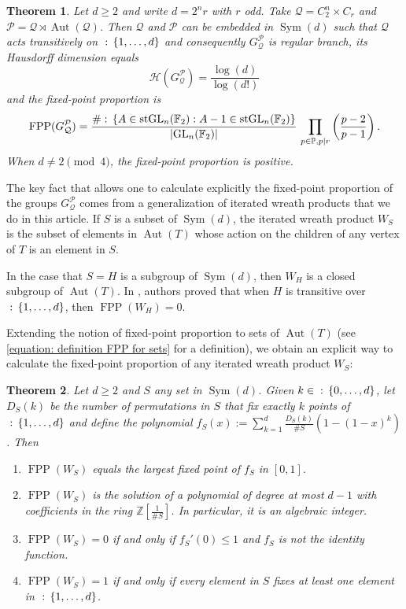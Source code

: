\documentclass{amsart}
\def\set#1{{\def\st{\;:\;}\left\{#1\right\}}}
\def\abs#1{\left\vert{#1}\right\vert}
\def\ZZ{\mathbb Z}
\def\PP{\mathbb P}
\def\FF{\mathbb F}
\DeclareMathOperator{\Aut}{Aut}
\DeclareMathOperator{\FPP}{FPP}
\DeclareMathOperator{\Sym}{Sym}
\DeclareMathOperator{\st}{st}
\DeclareMathOperator{\GL}{GL}
\newtheorem{Theorem}{Theorem}
\begin{document}
\begin{Theorem}
Let $d \geq 2$ and write $d = 2^n r$ with $r$ odd. Take $\mathcal{Q} = C_2^{n} \times C_r$ and $\mathcal{P} = \mathcal{Q} \rtimes \Aut(\mathcal{Q})$. Then $\mathcal{Q}$ and $\mathcal{P}$ can be embedded in $\Sym(d)$ such that $\mathcal{Q}$ acts transitively on $\set{1,\dots,d}$ and consequently $G_\mathcal{Q}^\mathcal{P}$ is regular branch, its Hausdorff dimension equals $$\mathcal{H}(G_\mathcal{Q}^\mathcal{P}) = \frac{\log(d)}{\log(d!)}$$ and the fixed-point proportion is $$\FPP(G_\mathcal{Q}^\mathcal{P}) = \frac{\# \set{A \in \GL_n(\FF_2): A-1 \in \GL_n(\FF_2)}}{\abs{\GL_n(\FF_2)}} \, \prod_{p \in \PP, p \mid r} \left( \frac{p - 2}{p - 1} \right).$$
When $d \neq 2 \pmod{4}$, the fixed-point proportion is positive.
\label{theorem: main theorem construction 2}
\end{Theorem}

The key fact that allows one to calculate explicitly the fixed-point proportion of the groups $G_\mathcal{Q}^\mathcal{P}$ comes from a generalization of iterated wreath products that we do in this article. If $S$ is a subset of $\Sym(d)$, the iterated wreath product $W_S$ is the subset of elements in $\Aut(T)$ whose action on the children of any vertex of $T$ is an element in $S$. 

In the case that $S = H$ is a subgroup of $\Sym(d)$, then $W_H$ is a closed subgroup of $\Aut(T)$. In \cite[Corollary 2.6]{AbertVirag2004}, authors proved that when $H$ is transitive over $\set{1,\dots,d}$, then $\FPP(W_H) = 0$.

Extending the notion of fixed-point proportion to sets of $\Aut(T)$ (see \cref{equation: definition FPP for sets} for a definition), we obtain an explicit way to calculate the fixed-point proportion of any iterated wreath product $W_S$:

\begin{Theorem}
Let $d \geq 2$ and $S$ any set in $\Sym(d)$. Given $k \in \set{0, \dots, d}$, let $D_S(k)$ be the number of permutations in $S$ that fix exactly $k$ points of $\set{1,\dots,d}$ and define the polynomial $f_S(x) := \sum_{k = 1}^d \frac{D_S(k)}{\# S} (1 - (1-x)^k)$. Then
\begin{enumerate}
    \item $\FPP(W_S)$ equals the largest fixed point of $f_S$ in $[0,1]$.
    \item $\FPP(W_S)$ is the solution of a polynomial of degree at most $d-1$ with coefficients in the ring $\ZZ\left[\frac{1}{\# S}\right]$. In particular, it is an algebraic integer.
    \item $\FPP(W_S) = 0$ if and only if $f_S'(0) \leq 1$ and $f_S$ is not the identity function.
    \item $\FPP(W_S) = 1$ if and only if every element in $S$ fixes at least one element in $\set{1,\dots,d}$.
\end{enumerate}
\label{theorem: FPP(WS) in introduction}
\end{Theorem}
\end{document}
